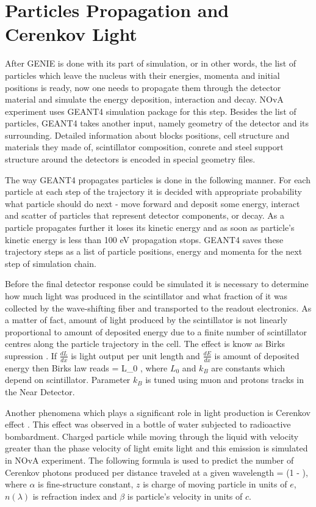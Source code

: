 \section{Particles Propagation and Cerenkov Light}
After GENIE is done with its part of simulation, or in other words, the list of particles which leave 
the nucleus with their energies, momenta and initial positions is ready, now one needs to propagate them
through the detector material and simulate the energy deposition, interaction and decay. NOvA experiment
uses GEANT4 \cite{GEANT4} simulation package for this step. Besides the list of particles, GEANT4 takes
another input, namely geometry of the detector and its surrounding. Detailed information about blocks 
positions, cell structure and materials they made of, scintillator composition, conrete and steel support
structure around the detectors is encoded in special geometry files.

The way GEANT4 propagates particles is done in the following manner. For each particle at each step of the 
trajectory it is decided with appropriate probability what particle should do next - move forward and deposit 
some energy, interact and scatter of particles that represent detector components, or decay. As a particle
propagates further it loses its kinetic energy and as soon as particle's kinetic energy is less than 100 eV
propagation stops. GEANT4 saves these trajectory steps as a list of particle positions, energy and momenta 
for the next step of simulation chain. 

Before the final detector response could be simulated it is necessary to determine how much light was produced
in the scintillator and what fraction of it was collected by the wave-shifting fiber and transported to the 
readout electronics. As a matter of fact, amount of light produced by the scintillator is not linearly 
proportional to amount of deposited energy due to a finite number of scintillator centres along the particle
trajectory in the cell. The effect is know as Birks supression \cite{birks}. If $\frac{dL}{dx}$ is light 
output per unit length and $\frac{dE}{dx}$ is amount of deposited energy then Birks law reads
\be
{} = L_0 , 
\ee
where $L_0$ and $k_B$ are constants which depend on scintillator. Parameter $k_B$ is tuned using muon and 
protons tracks in the Near Detector.

Another phenomena which plays a significant role in light production is Cerenkov effect \cite{cerenkov}. 
This effect was observed in a bottle of water subjected to radioactive bombardment. Charged particle while
moving through the liquid with velocity greater than the phase velocity of light emits light and this emission 
is simulated in NOvA experiment. The following formula is used to predict the number of Cerenkov photons produced
per distance traveled at a given wavelength 
\be
{} = \Big(1 - \Big),
\ee
where $\alpha$ is fine-structure constant, $z$ is charge of moving particle in units of $e$, $n(\lambda)$ is 
refraction index and $\beta$ is particle's velocity in units of $c$.

